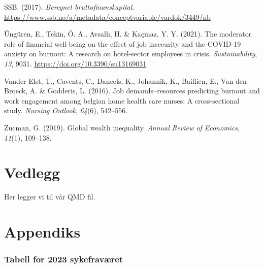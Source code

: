 \documentclass[
  12pt,
  a4paper,
  DIV=11,
  numbers=noendperiod]{scrartcl}
\newlength{\cslhangindent}
\newenvironment{CSLReferences}[2] %
 {\begin{list}{}{%
  \setlength{\itemindent}{0pt}
  \setlength{\leftmargin}{0pt}
  \setlength{\parsep}{0pt}
  \ifodd #1
   \setlength{\leftmargin}{\cslhangindent}
   \setlength{\itemindent}{-1\cslhangindent}
  \fi
  \setlength{\itemsep}{#2\baselineskip}}}
 {\end{list}}
\begin{document}
\begin{CSLReferences}{1}{0}
SSB. (2017). \emph{Beregnet bruttofinanskapital}.
\url{https://www.ssb.no/a/metadata/conceptvariable/vardok/3449/nb}

Üngüren, E., Tekin, Ö. A., Avsallı, H. \& Kaçmaz, Y. Y. (2021). The
moderator role of financial well-being on the effect of job insecurity
and the COVID-19 anxiety on burnout: A research on hotel-sector
employees in crisis. \emph{Sustainability}, \emph{13}, 9031.
\url{https://doi.org/10.3390/su13169031}

Vander Elst, T., Cavents, C., Daneels, K., Johannik, K., Baillien, E.,
Van den Broeck, A. \& Godderis, L. (2016). Job demands--resources
predicting burnout and work engagement among belgian home health care
nurses: A cross-sectional study. \emph{Nursing Outlook}, \emph{64}(6),
542--556.

Zucman, G. (2019). Global wealth inequality. \emph{Annual Review of
Economics}, \emph{11}(1), 109--138.

\end{CSLReferences}

\newpage

\section*{Vedlegg}\label{vedlegg}

Her legger vi til vår QMD fil.

\section*{Appendiks}\label{appendiks}

\subsubsection{Tabell for 2023
sykefraværet}\label{tabell-for-2023-sykefravuxe6ret}
\end{document}
